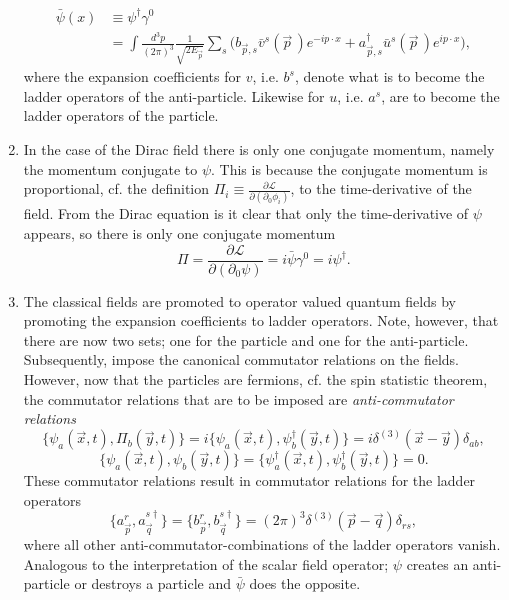 \begin{enumerate}
\begin{equation}
\end{equation} 
\begin{equation}
	\begin{split}
		\bar{\psi}(x)&\equiv\psi^\dagger\gamma^0\\
		&=\int \frac{d^3p}{(2\pi)^3}\frac{1}{\sqrt{2E_{\vec{p}}}}\sum_s\bigg(b_{\vec{p},s}\bar{v}^s(\vec{p}\,)e^{-ip\cdot x}+a_{\vec{p},s}^\dagger \bar{u}^s(\vec{p}\,)e^{ip\cdot x}\bigg),
	\end{split}
\end{equation} 
where the expansion coefficients for $v$, i.e. $b^s$, denote what is to become the ladder operators of the anti-particle. Likewise for $u$, i.e. $a^s$, are to become the ladder operators of the particle.

\item In the case of the Dirac field there is only one conjugate momentum, namely the momentum conjugate to $\psi$. This is because the conjugate momentum is proportional, cf. the definition $\Pi_i\equiv \frac{\partial \mathcal{L}}{\partial (\partial_0 \phi_i)}$, to the time-derivative of the field. From the Dirac equation is it clear that only the time-derivative of $\psi$ appears, so there is only one conjugate momentum
\begin{equation}
	\Pi=\frac{\partial \mathcal{L}}{\partial (\partial_0\psi)}=i\bar{\psi}\gamma^0=i\psi^\dagger.
\end{equation} 
\item The classical fields are promoted to operator valued quantum fields by promoting the expansion coefficients to ladder operators. Note, however, that there are now two sets; one for the particle and one for the anti-particle. Subsequently, impose the canonical commutator relations on the fields. However, now that the particles are fermions, cf. the spin statistic theorem, the commutator relations that are to be imposed are \emph{anti-commutator relations}
\begin{equation}
	\{\psi_a(\vec{x},t),\Pi_b(\vec{y},t)\}=i\{\psi_a(\vec{x},t),\psi^\dagger_b(\vec{y},t)\}=i\delta^{(3)}(\vec{x}-\vec{y})\delta_{ab},
\end{equation} 
\begin{equation}
	\{\psi_a(\vec{x},t),\psi_b(\vec{y},t)\}=\{\psi_a^\dagger(\vec{x},t),\psi_b^\dagger(\vec{y},t)\}=0.
\end{equation} 
These commutator relations result in commutator relations for the ladder operators
\begin{equation}
	\{a_{\vec{p}}^r,a_{\vec{q}}^{s\dagger}\}=\{b_{\vec{p}}^r,b_{\vec{q}}^{s\dagger}\}=(2\pi)^3\delta^{(3)}(\vec{p}-\vec{q})\delta_{rs},
\end{equation} 
where all other anti-commutator-combinations of the ladder operators vanish. Analogous to the interpretation of the scalar field operator; $\psi$ creates an anti-particle or destroys a particle and $\bar{\psi}$ does the opposite.


\end{enumerate}
